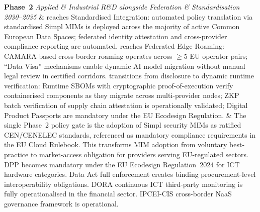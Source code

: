\begin{landscape}
\begin{longtable}
\textbf{Phase~2}
\newline\textit{Applied \& Industrial}
\newline\textit{R\&D alongside}
\newline\textit{Federation \&}
\newline\textit{Standardisation}
\newline\textit{2030--2035}
\newline{}
\newline{}
&
 reaches Standardised Integration: automated policy translation
via standardised Simpl MIMs is deployed across the majority of active
Common European Data Spaces; federated identity attestation and
cross-provider compliance reporting are automated.  reaches
Federated Edge Roaming: CAMARA-based cross-border roaming operates
across $\geq$5 EU operator pairs; ``Data Visa'' mechanisms enable
dynamic AI model migration without manual legal review in certified
corridors.  transitions from disclosure to dynamic runtime
verification: Runtime SBOMs with cryptographic proof-of-execution
verify containerised components as they migrate across multi-provider
nodes; ZKP batch verification of supply chain attestation is operationally
validated; Digital Product Passports are mandatory under the EU
Ecodesign Regulation.
&
The single Phase~2 policy gate is the adoption of Simpl security MIMs
as ratified CEN/CENELEC standards, referenced as mandatory compliance
requirements in the EU Cloud Rulebook. This transforms MIM adoption
from voluntary best-practice to market-access obligation for providers
serving EU-regulated sectors. DPP becomes mandatory under the EU
Ecodesign Regulation~2024 for ICT hardware categories. Data Act full
enforcement creates binding procurement-level interoperability
obligations. DORA continuous ICT third-party monitoring is fully
operationalised in the financial sector. IPCEI-CIS cross-border NaaS
governance framework is operational.

\end{longtable}
\end{landscape}
